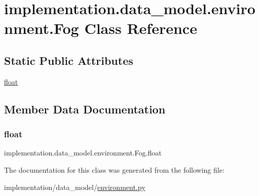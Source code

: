 \hypertarget{classimplementation_1_1data__model_1_1environment_1_1_fog}{}\section{implementation.\+data\+\_\+model.\+environment.\+Fog Class Reference}
\label{classimplementation_1_1data__model_1_1environment_1_1_fog}
\subsection*{Static Public Attributes}
\begin{DoxyCompactItemize}
\item 
\hyperlink{classimplementation_1_1data__model_1_1environment_1_1_fog_a0d2a0a81ca41c501ca6580fae9ac05fb}{float}
\end{DoxyCompactItemize}


\subsection{Member Data Documentation}
\mbox{\label{classimplementation_1_1data__model_1_1environment_1_1_fog_a0d2a0a81ca41c501ca6580fae9ac05fb}} 
\subsubsection{\texorpdfstring{float}{float}}
{\footnotesize\ttfamily implementation.\+data\+\_\+model.\+environment.\+Fog.\+float\hspace{0.3cm}{\ttfamily [static]}}



The documentation for this class was generated from the following file\+:\begin{DoxyCompactItemize}
\item 
implementation/data\+\_\+model/\hyperlink{environment_8py}{environment.\+py}\end{DoxyCompactItemize}
